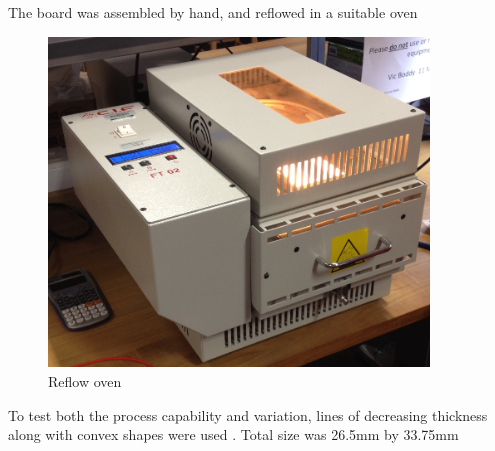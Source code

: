 \documentclass[]{article}
\begin{document}
The board was assembled by hand, and reflowed in a suitable oven

\begin{figure}[htb]
	\begin{center}
		\includegraphics[width = 0.9\textwidth]{oven}
	\end{center}
	\caption{Reflow oven}
	\label{fig:oven}
\end{figure} 

To test both the process capability and variation, lines of decreasing thickness along with convex shapes were used . Total size was 26.5mm by 33.75mm
\end{document}
